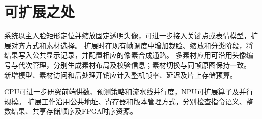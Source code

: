\section{可扩展之处}

系统以主人脸矩形定位并缩放固定透明头像，可进一步接入关键点或表情模型，扩展对齐方式和素材选择。
扩展时在现有帧调度中增加裁脸、缩放和分类阶段，将结果写入公共显示记录，并配置相应的像素合成通路。
多素材应用可沿用头像编号与代次管理，分别生成素材布局及校验信息；素材切换与同帧原图保持一致。
新增模型、素材访问和后处理开销应计入整机帧率、延迟及片上存储预算。

CPU可进一步研究前端供数、预测策略和流水线并行度，NPU可扩展算子及并行规模。
扩展工作沿用公共地址、寄存器和版本管理方式，分别检查指令语义、整数结果、共享存储顺序及FPGA时序资源。

